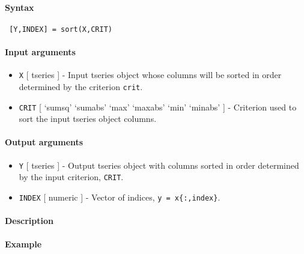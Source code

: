 


	\paragraph{Syntax}
 
 \begin{verbatim}
 [Y,INDEX] = sort(X,CRIT)
 \end{verbatim}
 
 \paragraph{Input arguments}
 
 \begin{itemize}
 \item
   \texttt{X} {[} tseries {]} - Input tseries object whose columns will
   be sorted in order determined by the criterion \texttt{crit}.
 \item
   \texttt{CRIT} {[} `sumsq' \textbar{} `sumabs' \textbar{} `max'
   \textbar{} `maxabs' \textbar{} `min' \textbar{} `minabs' {]} -
   Criterion used to sort the input tseries object columns.
 \end{itemize}
 
 \paragraph{Output arguments}
 
 \begin{itemize}
 \item
   \texttt{Y} {[} tseries {]} - Output tseries object with columns sorted
   in order determined by the input criterion, \texttt{CRIT}.
 \item
   \texttt{INDEX} {[} numeric {]} - Vector of indices,
   \texttt{y = x\{:,index\}}.
 \end{itemize}
 
 \paragraph{Description}
 
 \paragraph{Example}


